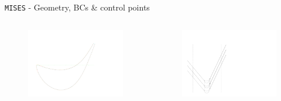 \begin{frame}{\texttt{MISES} - Geometry, BCs \& control points}
    \vspace{-3cm}
    \begin{columns}
        \vspace{2cm}
        \begin{figure}
            \centering
            \includegraphics[scale=0.3]{./images/datablade120-2.png}
        \end{figure}
        \begin{figure}
            \centering
            \includegraphics[scale=0.4]{./images/datablade120-1.png}
        \end{figure}
    \end{columns}
\end{frame}

